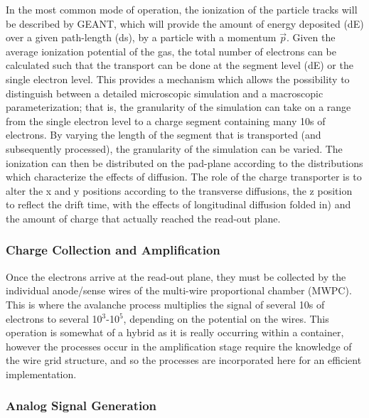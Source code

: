 \documentclass{article}
\begin{document}
In the most common mode of operation, the ionization of the particle 
tracks will be described
by GEANT, which will provide the amount of energy deposited (dE) 
over a given path-length (ds), by a particle with a momentum $\vec{p}$.
Given the average ionization potential of the gas, the total number of 
electrons can be calculated such that the transport can be done at the
segment level (dE) or the single electron level.  This provides a mechanism 
which allows the possibility to distinguish between a detailed microscopic 
simulation and
a macroscopic parameterization; that is, the granularity of the simulation
can take on a range from the single electron level to a charge segment
containing many 10s of electrons.
By varying the length of the segment that is transported (and subsequently
processed), the granularity of the simulation can be varied.  The ionization
can then be distributed on the pad-plane according to the distributions
which characterize the effects of diffusion.  The role of the charge 
transporter is
to alter the x and y positions according to the transverse diffusions, the
z position to reflect the drift time, with the effects of longitudinal
diffusion folded in) and the amount of charge that actually reached the
read-out plane.

\subsubsection{Charge Collection and Amplification}
\label{sec:chargeCollection}

Once the electrons arrive at the read-out plane, they must be 
collected by the individual anode/sense wires of the multi-wire 
proportional chamber (MWPC).
This is where the avalanche process multiplies
the signal of several 10s of electrons to several 10$^{3}$-10$^{5}$, depending
on the potential on the wires.  This operation is somewhat of a hybrid as
it is really occurring within a container, however the processes
occur in the amplification
stage require the knowledge of the wire grid structure, and so the
processes are incorporated here for an efficient implementation.

\subsubsection{Analog Signal Generation}
\label{sec:analogSignalGeneration}
\end{document}
